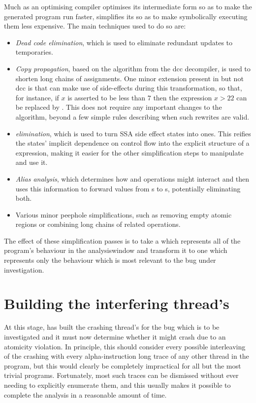 Much as an optimising compiler optimises its intermediate form so as
to make the generated program run faster, {\technique} simplifies its
{\StateMachines} so as to make symbolically executing them less
expensive.  The main techniques used to do so are:
\begin{itemize}
\item \emph{Dead code elimination}, which is used to eliminate
  redundant updates to {\StateMachine} temporaries.
\item \emph{Copy propagation}, based on the algorithm from the
  dcc\cite{Cifuentes1994} decompiler, is used to shorten long chains
  of assignments.  One minor extension present in {\technique} but not
  dcc is that {\technique} can make use of  side-effects
  during this transformation, so that, for instance, if $x$ is
  asserted to be less than $7$ then the expression $x > 22$ can be
  replaced by \false.  This does not require any important changes to
  the algorithm, beyond a few simple rules describing when such
  rewrites are valid.
\item \emph{{\stPhi} elimination}, which is used to turn SSA {\stPhi}
  side effect states into  ones.  This reifies the
  {\stPhi} states' implicit dependence on {\StateMachine} control flow
  into the explicit structure of a {\StateMachine} expression, making
  it easier for the other simplification steps to manipulate and use
  it.
\item \emph{Alias analysis}, which determines how  and
   operations might interact and then uses this
  information to forward values from s to s,
  potentially eliminating both.
\item Various minor peephole simplifications, such as removing empty
  atomic regions or combining long chains of related 
  operations.
\end{itemize}
The effect of these simplification passes is to take a {\StateMachine}
which represents all of the program's behaviour in the
\gls{analysiswindow} and transform it to one which represents only the
behaviour which is most relevant to the bug under
investigation.

\section{Building the interfering thread's \StateMachines}
\label{sect:derive:write_side}

At this stage, {\technique} has built the crashing thread's
{\StateMachine} for the bug which is to be investigated and it must
now determine whether it might crash due to an atomicity violation.
In principle, this should consider every possible interleaving of the
crashing {\StateMachine} with every \gls{alpha}-instruction long trace
of any other thread in the program, but this would clearly be
completely impractical for all but the most trivial programs.
Fortunately, most such traces can be dismissed without ever needing to
explicitly enumerate them, and this usually makes it possible to
complete the analysis in a reasonable amount of time.

